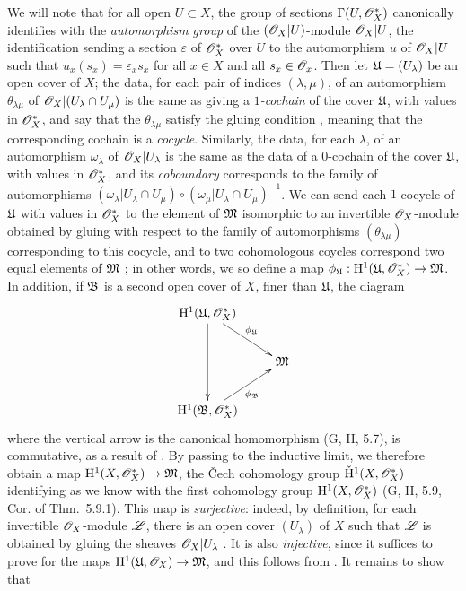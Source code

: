 \begin{env}[5.4.7]
We will note that for all open $U\subset X$, the group of sections
$\Gamma(U,\mathscr{O}_X^*)$ canonically identifies with the {\em automorphism group} of
the $(\mathscr{O}_X|U)$-module $\mathscr{O}_X|U$, the identification sending a section
$\varepsilon$ of $\mathscr{O}_X^*$ over $U$ to the automorphism $u$ of $\mathscr{O}_X|U$ such
that $u_x(s_x)=\varepsilon_x s_x$ for all $x\in X$ and all $s_x\in\mathscr{O}_x$. Then
let $\mathfrak{U}=(U_\lambda)$ be an open cover of $X$; the data, for each pair
of indices $(\lambda,\mu)$, of an automorphism $\theta_{\lambda\mu}$ of
$\mathscr{O}_X|(U_\lambda\cap U_\mu)$ is the same as giving a {\em $1$-cochain} of the
cover $\mathfrak{U}$, with values in $\mathscr{O}_X^*$, and say that the
$\theta_{\lambda\mu}$ satisfy the gluing condition , meaning
that the corresponding cochain is a {\em cocycle}. Similarly, the data, for
each $\lambda$, of an automorphism $\omega_\lambda$ of $\mathscr{O}_X|U_\lambda$ is the
same as the data of a $0$-cochain of the cover $\mathfrak{U}$, with values in
$\mathscr{O}_X^*$, and its {\em coboundary} corresponds to the family of automorphisms
$(\omega_\lambda|U_\lambda\cap U_\mu)
  \circ(\omega_\mu|U_\lambda\cap U_\mu)^{-1}$. We can send each $1$-cocycle of
$\mathfrak{U}$ with values in $\mathscr{O}_X^*$ to the element of $\mathfrak{M}$
isomorphic to an invertible $\mathscr{O}_X$-module obtained by gluing with respect to
the family of automorphisms $(\theta_{\lambda\mu})$ corresponding to this
cocycle, and to two cohomologous coycles correspond two equal elements of
$\mathfrak{M}$ ; in other words, we so define a map
$\phi_\mathfrak{U}:\mathrm{H}^1(\mathfrak{U},\mathscr{O}_X^*)\to\mathfrak{M}$. In addition, if
$\mathfrak{B}$ is a second open cover of $X$, finer than $\mathfrak{U}$, the
diagram
\[
  \xymatrix{
    \HH^1(\fk{U},\OO_X^*)\ar[rd]^{\vphi_\fk{U}}\ar[dd]\\
    & \fk{M}\\
    \HH^1(\fk{B},\OO_X^*)\ar[ur]_{\vphi_\fk{B}}
  }
\]
where the vertical arrow is the canonical homomorphism (G, II, 5.7), is
commutative, as a result of . By passing to the inductive
limit, we therefore obtain a map $\mathrm{H}^1(X,\mathscr{O}_X^*)\to\mathfrak{M}$, the \v Cech
cohomology group $\check{\mathrm{H}}^1(X,\mathscr{O}_X^*)$ identifying as we know with the
first cohomology group $\mathrm{H}^1(X,\mathscr{O}_X^*)$ (G, II, 5.9, Cor. of Thm.~5.9.1). This
map is {\em surjective}: indeed, by definition, for each invertible
$\mathscr{O}_X$-module $\mathscr{L}$, there is an open cover $(U_\lambda)$ of $X$ such that
$\mathscr{L}$ is obtained by gluing the sheaves $\mathscr{O}_X|U_\lambda$ .
It is also {\em injective}, since it suffices to prove for the maps
$\mathrm{H}^1(\mathfrak{U},\mathscr{O}_X)\to\mathfrak{M}$, and this follows from
. It remains to show that

\end{env}
